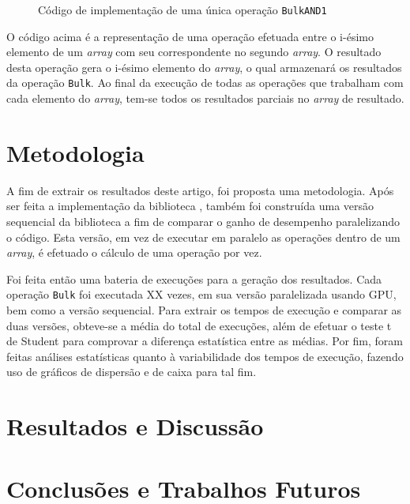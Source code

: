 \documentclass[12pt]{article}
\begin{document}
\begin{figure}[!h]
\centering

\caption{Código de implementação de uma única operação \texttt{BulkAND1}}
\label{fig:bulkoperation}
\end{figure}

	O código acima é a representação de uma operação efetuada entre o i-ésimo elemento de um \textit{array} com seu correspondente no segundo \textit{array}. O resultado desta operação gera o i-ésimo elemento do \textit{array}, o qual armazenará os resultados da operação \texttt{Bulk}. Ao final da execução de todas as operações que trabalham com cada elemento do \textit{array}, tem-se todos os resultados parciais no \textit{array} de resultado.

\section{Metodologia}
\label{sec:metodologia}

	A fim de extrair os resultados deste artigo, foi proposta uma metodologia. Após ser feita a implementação da biblioteca \libname, também foi construída uma versão sequencial da biblioteca a fim de comparar o ganho de desempenho paralelizando o código. Esta versão, em vez de executar em paralelo as operações dentro de um \textit{array}, é efetuado o cálculo de uma operação por vez.
	
	Foi feita então uma bateria de execuções para a geração dos resultados. Cada operação \texttt{Bulk} foi executada  XX vezes, em sua versão paralelizada usando GPU, bem como a versão sequencial. Para extrair os tempos de execução e comparar as duas versões, obteve-se a média do total de execuções, além de efetuar o teste t de Student para comprovar a diferença estatística entre as médias. Por  fim, foram feitas análises estatísticas quanto à variabilidade dos tempos de execução, fazendo uso de gráficos de dispersão e de caixa para tal fim.
	

\section{Resultados e Discussão}	
\label{sec:resultados}	

\section{Conclusões e Trabalhos Futuros}
\label{sec:conclusoes}	
	
\end{document}

